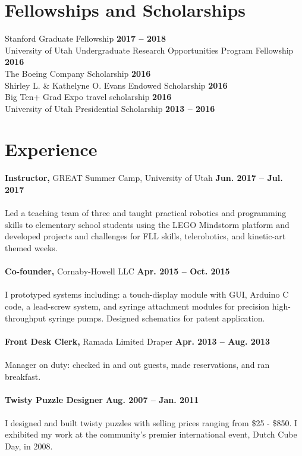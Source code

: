 \documentclass[margin,line]{res}
\begin{document}
\begin{resume}
\section{\sc Fellowships and Scholarships}
Stanford Graduate Fellowship \hfill {\bf 2017 – 2018}\\
University of Utah Undergraduate Research Opportunities Program Fellowship \hfill {\bf 2016}\\
The Boeing Company Scholarship \hfill {\bf 2016}\\
Shirley L. \& Kathelyne O. Evans Endowed Scholarship \hfill {\bf 2016}\\
Big Ten+ Grad Expo travel scholarship \hfill {\bf 2016}\\
University of Utah Presidential Scholarship \hfill {\bf 2013 – 2016}
\\

\section{\sc Experience}
{\bf Instructor,} GREAT Summer Camp, University of Utah
\hfill {\bf Jun. 2017 – Jul. 2017}\\
\\
Led a teaching team of three and taught practical robotics and programming skills to elementary school students using the LEGO Mindstorm platform and developed projects and challenges for FLL skills, telerobotics, and kinetic-art themed weeks.\\
\\
{\bf Co-founder,} Cornaby-Howell LLC
\hfill {\bf Apr. 2015 – Oct. 2015}\\
\\
I prototyped systems including: a touch-display module with GUI, Arduino C code, a lead-screw system,
and syringe attachment modules for precision high-throughput syringe pumps. Designed schematics for patent application.\\
\\
{\bf Front Desk Clerk,} Ramada Limited Draper
\hfill {\bf Apr. 2013 – Aug. 2013}\\
\\
Manager on duty: checked in and out guests, made reservations, and ran breakfast.\\
\\
{\bf Twisty Puzzle Designer} 
\hfill {\bf Aug. 2007 – Jan. 2011}\\
\\
I designed and built twisty puzzles with selling prices ranging from \$25 - \$850. I exhibited my work at
the community’s premier international event, Dutch Cube Day, in 2008.\\
\\


\end{resume}
\end{document}
